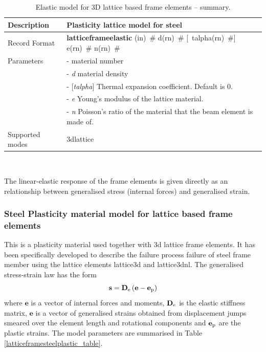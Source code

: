 \documentclass[a4paper]{article}
\newcommand{\descitem}[1]{{\noindent \bf #1}}
\newcommand{\elemparam}[2]{{{#1\tiny (#2)}~\#}}
\newcommand{\optelemparam}[2]{[{~\elemparam{#1}{#2}}]}
\newcommand{\param}[1]{{\it #1}}
\newcommand{\optparam}[1]{[{\it #1}]}
\newenvironment{mmt}{\begin{tabular}{|l|p{9cm}|}}{\end{tabular}\\}
\newenvironment{mmt}{\begin{tabular}{|l|l|}}{\end{tabular}\\}
\begin{document}
\begin{table}[!htb]
\begin{mmt}
\hline
Description & Plasticity lattice model for steel \\
\hline
Record Format & \descitem{latticeframeelastic} \elemparam{}{in}
\elemparam{d}{rn} \optelemparam{talpha}{rn} \elemparam{e}{rn} \elemparam{n}{rn}\\
Parameters &- \param{} material number\\
&- \param{d} material density\\
&- \optparam{talpha} Thermal expansion coefficient. Default is 0.\\
&- \param{e} Young's modulus of the lattice material.\\
&- \param{n} Poisson's ratio of the material that the beam element is made of.\\
Supported modes & 3dlattice\\
\hline
\end{mmt}
\caption{Elastic model for 3D lattice based frame elements -- summary.}
\label{latticeframeelastic_table}
  \end{table}
The linear-elastic response of the frame elements is given directly as an relationship between generalised stress (internal forces) and generalised strain. 
%


\subsubsection{Steel Plasticity material model for lattice based frame elements}
This is a plasticity material used together with 3d lattice frame elements. It has been specifically developed to describe the failure process failure of steel frame member using the lattice elements lattice3d and lattice3dnl. 
The generalised stress-strain law has the form
\begin{equation}
  \mathbf{s} = \mathbf{D}_{\rm e} \left(\mathbf{e}-\mathbf{e}_{\rm p} \right)
\end{equation}
where $\mathbf{e}$ is a vector of internal forces and moments, $\mathbf{D}_{\rm e}$ is the elastic stiffness matrix, $\mathbf{e}$ is a vector of generalised strains obtained from displacement jumps smeared over the element length and rotational components and $\mathbf{e}_{\rm p}$ are the plastic strains. The model parameters are summarised in Table \ref{latticeframesteelplastic_table}.
\end{document}
